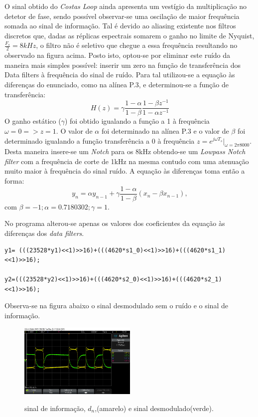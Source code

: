 \documentclass[11pt]{article}
\numberwithin{equation}{section}
\begin{document}
O sinal obtido do \textit{Costas Loop} ainda apresenta um vestígio da multiplicação no detetor de fase, sendo possível observar-se uma oscilação de maior frequência somada ao sinal de informação. Tal é devido ao aliasing existente nos filtros discretos que, dadas as réplicas espectrais somarem o ganho no limite de Nyquist, $\frac{F_s}{2} = 8kHz$, o filtro  não é seletivo que chegue a essa frequência resultando no observado na figura acima. Posto isto, optou-se por eliminar este ruído da maneira mais simples possível: inserir um zero na função de transferência dos Data filters à frequência do sinal de ruído. Para tal utilizou-se a equação às diferenças do enunciado, como na alínea P.3, e determinou-se a função de transferência:
\begin{equation}
H(z) = \gamma\frac{1-\alpha}{1-\beta}\dfrac{1-\beta z^{-1}}{1-\alpha z^{-1}}
\end{equation}
O ganho estático ($\gamma$) foi obtido igualando a função a 1 à frequência $\omega=0 => z=1$. O valor de $\alpha$ foi determinado na alínea P.3 e o valor de $\beta$ foi determinado igualando a função transferência a 0 à frequência $z=e^{j\omega T_s}|_{\omega=2\pi8000}$. Desta maneira insere-se um \textit{Notch} para os 8kHz obtendo-se um \textit{Lowpass Notch filter} com a frequência de corte de 1kHz na mesma contudo com uma atenuação muito maior à frequência do sinal ruído.
A equação às diferenças toma então a forma:
\begin{equation}
y_n = \alpha y_{n-1}+\gamma\frac{1-\alpha}{1-\beta}(x_n-\beta x_{n-1}), 
\end{equation}
com $\beta=-1; \alpha=0.7180302; \gamma=1.$

No programa alterou-se apenas os valores dos coeficientes da equação às diferenças dos \textit{data filters}.

\begin{lstlisting}
y1= (((23528*y1)<<1)>>16)+(((4620*s1_0)<<1)>>16)+(((4620*s1_1)<<1)>>16);

y2=(((23528*y2)<<1)>>16)+(((4620*s2_0)<<1)>>16)+(((4620*s2_1)<<1)>>16);
\end{lstlisting}
Observa-se na figura abaixo o sinal desmodulado sem o ruído e o sinal de informação.

\begin{figure}[H]
	\centering
	\includegraphics[width=0.5\textwidth]{./dn_y1}~\\
	\caption{sinal de informação, $d_n$,(amarelo) e sinal desmodulado(verde).}
	\label{demod}
\end{figure}
\end{document}
